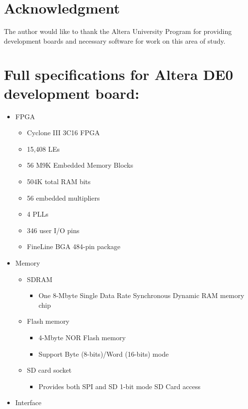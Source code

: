 \documentclass[11pt,peerreview, onecolumn]{IEEEtran}
\begin{document}
\section*{Acknowledgment}
The author would like to thank the Altera University Program \cite{UniProgram} for providing development boards and necessary software for work on this area of study.

\appendices
\label{App:AppendixA}
\section{Full specifications for Altera DE0 development board:}
\begin{itemize}
\item FPGA
	\begin{itemize}
 	\item Cyclone III 3C16 FPGA
	\item 15,408 LEs
	\item 56 M9K Embedded Memory Blocks
	\item 504K total RAM bits
	\item 56 embedded multipliers
	\item 4 PLLs
	\item 346 user I/O pins
	\item FineLine BGA 484-pin package
	\end{itemize}
\item Memory
	\begin{itemize}
	\item SDRAM
		\begin{itemize}
		\item One 8-Mbyte Single Data Rate Synchronous Dynamic RAM memory chip
		\end{itemize}
	\item Flash memory
		\begin{itemize}
		\item 4-Mbyte NOR Flash memory
		\item Support Byte (8-bits)/Word (16-bits) mode
		\end{itemize}
	\item SD card socket
		\begin{itemize}
		\item Provides both SPI and SD 1-bit mode SD Card access
		\end{itemize}
	\end{itemize}
\item Interface
	\begin{itemize}

\end{itemize}
\end{itemize}
\end{document}
